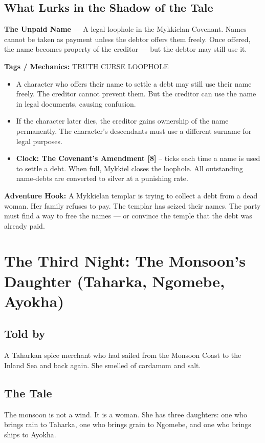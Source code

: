 \documentclass[10pt,twoside]{book}
\newcommand{\tag}[1]{\textsc{#1}}
\begin{document}
\section*{What Lurks in the Shadow of the Tale}
\begin{infobox}
\textbf{The Unpaid Name} --- A legal loophole in the Mykkielan Covenant. Names cannot be taken as payment unless the debtor offers them freely. Once offered, the name becomes property of the creditor --- but the debtor may still use it.

\textbf{Tags / Mechanics:} \tag{TRUTH} \tag{CURSE} \tag{LOOPHOLE}

\begin{itemize}
\item A character who offers their name to settle a debt may still use their name freely. The creditor cannot prevent them. But the creditor can use the name in legal documents, causing confusion.
\item If the character later dies, the creditor gains ownership of the name permanently. The character's descendants must use a different surname for legal purposes.
\item \textbf{Clock: The Covenant's Amendment [8]} -- ticks each time a name is used to settle a debt. When full, Mykkiel closes the loophole. All outstanding name‑debts are converted to silver at a punishing rate.
\end{itemize}

\textbf{Adventure Hook:} A Mykkielan templar is trying to collect a debt from a dead woman. Her family refuses to pay. The templar has seized their names. The party must find a way to free the names --- or convince the temple that the debt was already paid.
\end{infobox}

\chapter{The Third Night: The Monsoon's Daughter (Taharka, Ngomebe, Ayokha)}

\section*{Told by}
A Taharkan spice merchant who had sailed from the Monsoon Coast to the Inland Sea and back again. She smelled of cardamom and salt.

\section*{The Tale}
The monsoon is not a wind. It is a woman. She has three daughters: one who brings rain to Taharka, one who brings grain to Ngomebe, and one who brings ships to Ayokha.
\end{document}
